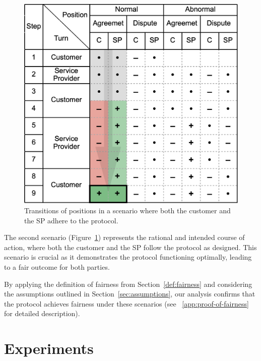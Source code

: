 \documentclass[pdftex,twocolumn,epjc3]{svjour3}
\begin{document}
\begin{figure}[h!]
\includegraphics[width=\linewidth]{rational.png}
\centering
\caption{Transitions of positions in a scenario where both the customer and the SP adhere to the protocol.}
\label{fig:rational}
\end{figure}

The second scenario (Figure~\ref{fig:rational}) represents the rational and intended course of action, where both the customer and the SP follow the protocol as designed. This scenario is crucial as it demonstrates the protocol functioning optimally, leading to a fair outcome for both parties.

By applying the definition of fairness from Section~\ref{def:fairness} and considering the assumptions outlined in Section~\ref{sec:assumptions}, our analysis confirms that the protocol achieves fairness under these scenarios (see ~\ref{app:proof-of-fairness} for detailed description).

\section{Experiments}\label{sec:experiments}
\end{document}
